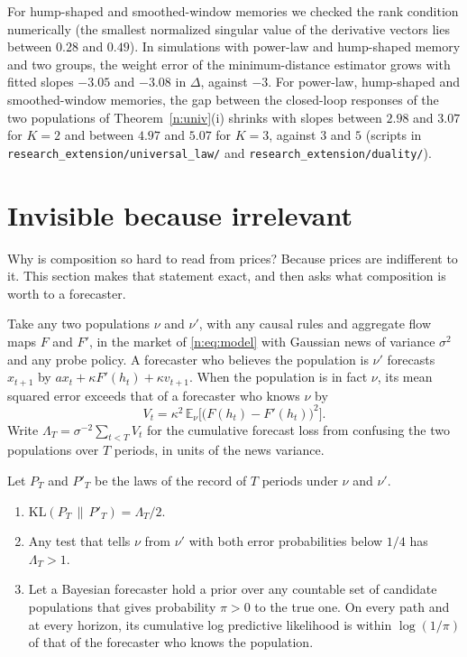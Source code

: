 For hump-shaped and smoothed-window memories we checked the rank condition numerically (the smallest normalized singular value of the derivative vectors lies between $0.28$ and $0.49$). In simulations with power-law and hump-shaped memory and two groups, the weight error of the minimum-distance estimator grows with fitted slopes $-3.05$ and $-3.08$ in $\Delta$, against $-3$. For power-law, hump-shaped and smoothed-window memories, the gap between the closed-loop responses of the two populations of Theorem~\ref{n:univ}(i) shrinks with slopes between $2.98$ and $3.07$ for $K=2$ and between $4.97$ and $5.07$ for $K=3$, against $3$ and $5$ (scripts in \nolinkurl{research_extension/universal_law/} and \nolinkurl{research_extension/duality/}).

\section{Invisible because irrelevant}\label{n:irr_sec}

Why is composition so hard to read from prices? Because prices are indifferent to it. This section makes that statement exact, and then asks what composition is worth to a forecaster.

Take any two populations $\nu$ and $\nu'$, with any causal rules and aggregate flow maps $F$ and $F'$, in the market of \eqref{n:eq:model} with Gaussian news of variance $\sigma^2$ and any probe policy. A forecaster who believes the population is $\nu'$ forecasts $x_{t+1}$ by $ax_t+\kappa F'(h_t)+\kappa v_{t+1}$. When the population is in fact $\nu$, its mean squared error exceeds that of a forecaster who knows $\nu$ by
\[
V_t=\kappa^2\,\mathbb E_\nu\big[\big(F(h_t)-F'(h_t)\big)^2\big].
\]
Write $\Lambda_T=\sigma^{-2}\sum_{t<T}V_t$ for the cumulative forecast loss from confusing the two populations over $T$ periods, in units of the news variance.

\begin{theorem}\label{n:dual}
Let $P_T$ and $P'_T$ be the laws of the record of $T$ periods under $\nu$ and $\nu'$.
\begin{enumerate}[label=(\roman*),itemsep=1pt]
\item $\mathrm{KL}(P_T\,\|\,P'_T)=\Lambda_T/2$.
\item Any test that tells $\nu$ from $\nu'$ with both error probabilities below $1/4$ has $\Lambda_T>1$.
\item Let a Bayesian forecaster hold a prior over any countable set of candidate populations that gives probability $\pi>0$ to the true one. On every path and at every horizon, its cumulative log predictive likelihood is within $\log(1/\pi)$ of that of the forecaster who knows the population.
\end{enumerate}
\end{theorem}

